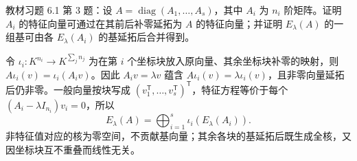 \begin{example}
\label{ex:xie-61-03}
教材习题 6.1 第 3 题：设 $A=\operatorname{diag}(A_1,\ldots,A_s)$，其中 $A_i$ 为 $n_i$ 阶矩阵。证明 $A_i$ 的特征向量可通过在其前后补零延拓为 $A$ 的特征向量；并证明 $E_\lambda(A)$ 的一组基可由各 $E_\lambda(A_i)$ 的基延拓后合并得到。
\end{example}
\begin{solve}
令 $\iota_i:K^{n_i}\to K^{\sum_jn_j}$ 为在第 $i$ 个坐标块放入原向量、其余坐标块补零的映射，则 $A\iota_i(v)=\iota_i(A_iv)$。因此 $A_iv=\lambda v$ 蕴含 $A\iota_i(v)=\lambda\iota_i(v)$，且非零向量延拓后仍非零。一般向量按块写成 $(v_1^{\mathsf T},\ldots,v_s^{\mathsf T})^{\mathsf T}$，特征方程等价于每个 $(A_i-\lambda I_{n_i})v_i=0$，所以
\[
 E_\lambda(A)=\bigoplus_{i=1}^s\iota_i(E_\lambda(A_i)).
\]
非特征值对应的核为零空间，不贡献基向量；其余各块的基延拓后既生成全核，又因坐标块互不重叠而线性无关。
\end{solve}

